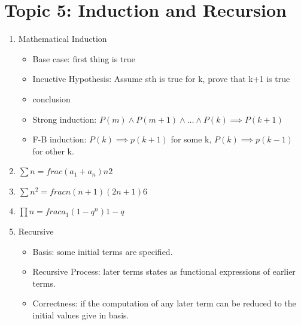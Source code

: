\documentclass[11pt, a4paper]{article}
\begin{document}
\section*{Topic 5: Induction and Recursion}
    \begin{enumerate}
        \item Mathematical Induction
            \begin{itemize}
                \item Base case: first thing is true
                \item Incuctive Hypothesis: Assume sth is true for k, prove that k+1 is true
                \item conclusion
                \item Strong induction: $P(m) \land P(m+1) \land \dots \land P(k) \implies P(k+1)$
                \item F-B induction: $P(k) \implies p(k+1)$ for some k,  $P(k) \implies p(k-1)$ for other k.
            \end{itemize}
        \item $\sum{n} = frac {(a_1 + a_n)n}{2}$
        \item $\sum{n^2} = frac{n(n+1)(2n+1)}{6}$
        \item $\prod{n} = frac {a_1(1-q^n)}{1-q}$
        \item Recursive
            \begin{itemize}
                \item Basis: some initial terms are specified.
                \item Recursive Process: later terms states as functional expressions of earlier terms.
                \item Correctness: if the computation of any later term can be reduced to the initial values give in basis.
            \end{itemize}
    \end{enumerate}
\end{document}
